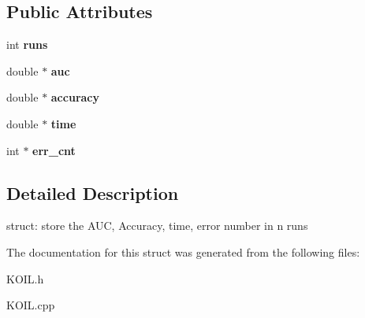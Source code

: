 \subsection*{Public Attributes}
\begin{DoxyCompactItemize}
\item 
\hypertarget{structkoil__result_ab1057a7dc8f658335c3a1373315dec9e}{int {\bfseries runs}}\label{structkoil__result_ab1057a7dc8f658335c3a1373315dec9e}

\item 
\hypertarget{structkoil__result_a1aa1c91489c723742e7e514055c2a3d9}{double $\ast$ {\bfseries auc}}\label{structkoil__result_a1aa1c91489c723742e7e514055c2a3d9}

\item 
\hypertarget{structkoil__result_aaf6527b5ff0dc5f9fc66de8a0e77c151}{double $\ast$ {\bfseries accuracy}}\label{structkoil__result_aaf6527b5ff0dc5f9fc66de8a0e77c151}

\item 
\hypertarget{structkoil__result_ab0d9b4b96c40da6fcbefbf6c533d4496}{double $\ast$ {\bfseries time}}\label{structkoil__result_ab0d9b4b96c40da6fcbefbf6c533d4496}

\item 
\hypertarget{structkoil__result_a959b0155ecc8c15c2d6e2d943b772b80}{int $\ast$ {\bfseries err\+\_\+cnt}}\label{structkoil__result_a959b0155ecc8c15c2d6e2d943b772b80}

\end{DoxyCompactItemize}


\subsection{Detailed Description}
struct\+: store the A\+U\+C, Accuracy, time, error number in n runs 

The documentation for this struct was generated from the following files\+:\begin{DoxyCompactItemize}
\item 
K\+O\+I\+L.\+h\item 
K\+O\+I\+L.\+cpp\end{DoxyCompactItemize}

